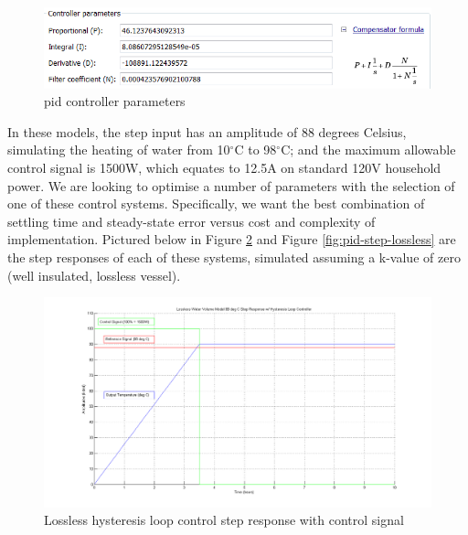 \documentclass{article}
\begin{document}
\begin{figure}[H]
\begin{center}
\includegraphics[scale=0.50]{pid-parameters.png}
\caption{\gls{pid} controller parameters}
\label{fig:pid-parameters}
\end{center}
\end{figure}

In these models, the step input has an amplitude of 88 degrees Celsius, simulating the heating of water from 10$^{\circ}$C to 98$^{\circ}$C; and the maximum allowable control signal is 1500W, which equates to 12.5A on standard 120V household power. We are looking to optimise a number of parameters with the selection of one of these control systems. Specifically, we want the best combination of settling time and steady-state error versus cost and complexity of implementation. Pictured below in Figure \ref{fig:hysteresis-step-lossless} and Figure \ref{fig:pid-step-lossless} are the step responses of each of these systems, simulated assuming a k-value of zero (well insulated, lossless vessel).

\begin{figure}[H]
\begin{center}
\includegraphics[scale=0.30]{hysteresis-step-lossless.png}
\caption{Lossless hysteresis loop control step response with control signal}
\label{fig:hysteresis-step-lossless}
\end{center}
\end{figure}
\end{document}
